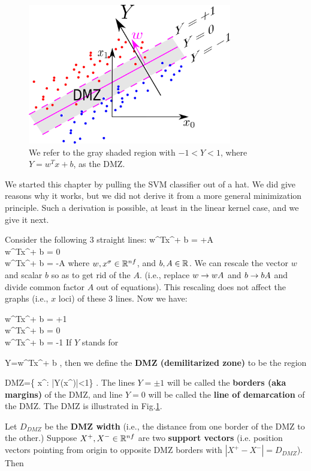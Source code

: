 \begin{figure}[h!]
\centering
\includegraphics[width=3.5in]
{svm/svm-dmz.png}
\caption{We refer to the gray shaded region
with $-1<Y<1$, where $Y= w^T x +b$,  
as the DMZ.}
\label{fig-svm-dmz}
\end{figure}

We started this
chapter by pulling the SVM classifier
out of a hat. We did give
reasons why it works, but we did not derive
it from a more general minimization
principle. Such a derivation
is possible, at least in the 
linear kernel case, and we give it next.


Consider the following 3 straight lines:
\beqa
w^Tx^\s + b = +A
\\
w^Tx^\s + b = 0
\\
w^Tx^\s + b = -A
\eeqa
where $w, x^\sigma\in { \mathbb{R}}^{nf}$, and $b,A\in { \mathbb{R}}$.
We can rescale the vector $w$ and 
scalar $b$ so as to get rid of the $A$.
(i.e., replace $w\rightarrow wA$ and $b\rightarrow bA$
and divide common factor $A$ out of equations).
This rescaling does not
affect the graphs (i.e., $x$ loci)
of these 3 lines. Now we have:


\beqa
w^Tx^\s + b = +1
\\
w^Tx^\s + b = 0
\\
w^Tx^\s + b = -1
\eeqa
If $Y$ stands for

\beq
Y=w^Tx^\s + b
\;,
\eeq
then we define
the {\bf DMZ (demilitarized zone)}
to be the region 

\beq
DMZ=\{  x^\s: |Y(x^\s)|<1\}
\;.
\eeq
The lines $Y=\pm 1$
will be called the {\bf borders (aka margins)}
of the DMZ, and 
line $Y=0$
will be called the
{\bf line of demarcation}
of the DMZ.
The DMZ is illustrated in Fig.\ref{fig-svm-dmz}.

Let $D_{DMZ}$ be
the {\bf DMZ width} (i.e., 
the distance from one border
of the DMZ to the other.)
Suppose $X^+, X^-\in { \mathbb{R}}^{nf}$
are two {\bf support vectors}
(i.e. position vectors pointing 
from origin to opposite DMZ borders
with $|X^+-X^-|=D_{DMZ}$). Then 

